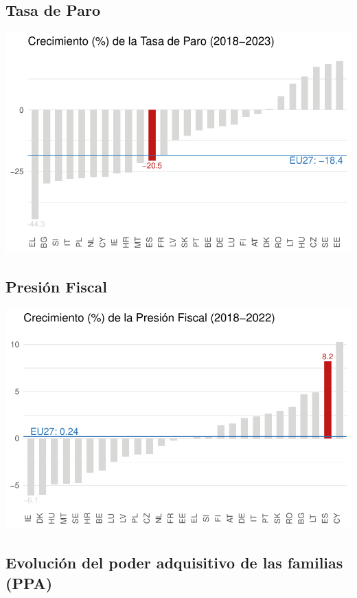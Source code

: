 \documentclass[
  letterpaper,
  DIV=11,
  numbers=noendperiod]{scrartcl}
\begin{document}
\hypertarget{tasa-de-paro}{%
\subsection{Tasa de Paro}\label{tasa-de-paro}}

\includegraphics{Trabajo_files/figure-pdf/unnamed-chunk-19-1.pdf}

\hypertarget{presiuxf3n-fiscal}{%
\subsection{Presión Fiscal}\label{presiuxf3n-fiscal}}

\includegraphics{Trabajo_files/figure-pdf/unnamed-chunk-23-1.pdf}

\hypertarget{evoluciuxf3n-del-poder-adquisitivo-de-las-familias-ppa}{%
\subsection{Evolución del poder adquisitivo de las familias
(PPA)}\label{evoluciuxf3n-del-poder-adquisitivo-de-las-familias-ppa}}
\end{document}
